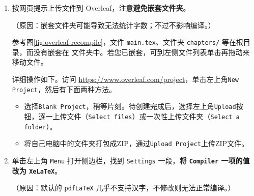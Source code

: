 \begin{enumerate}
  \item 按网页提示上传文件到 Overleaf，注意\textbf{避免嵌套文件夹}。

    （原因：嵌套文件夹可能导致无法统计字数；不过不影响编译。）

    参考图\ref{fig:overleaf-recompile}，文件 \texttt{main.tex}、文件夹 \texttt{chapters/} 等在根目录，而没有嵌套在  文件夹中。若您已嵌套，可到左侧文件列表单击再拖动来移动文件。

    详细操作如下。访问 \url{https://www.overleaf.com/project}，单击左上角\texttt{New Project}，然后有下面两种方法。

    \begin{itemize}
      \item 选择\texttt{Blank Project}，稍等片刻。待创建完成后，选择左上角\texttt{Upload}按钮，逐一上传文件（\texttt{Select files}）或一次性上传文件夹（\texttt{Select a folder}）。
      \item 将自己电脑中的文件夹打包成ZIP，通过\texttt{Upload Project}上传ZIP文件。
    \end{itemize}

  \item 单击左上角 \texttt{Menu} 打开侧边栏，找到 \texttt{Settings} 一段，\textbf{将 \texttt{Compiler} 一项的值改为 \texttt{XeLaTeX}}。

    （原因：默认的 \texttt{pdfLaTeX} 几乎不支持汉字，不修改则无法正常编译。）
\end{enumerate}
